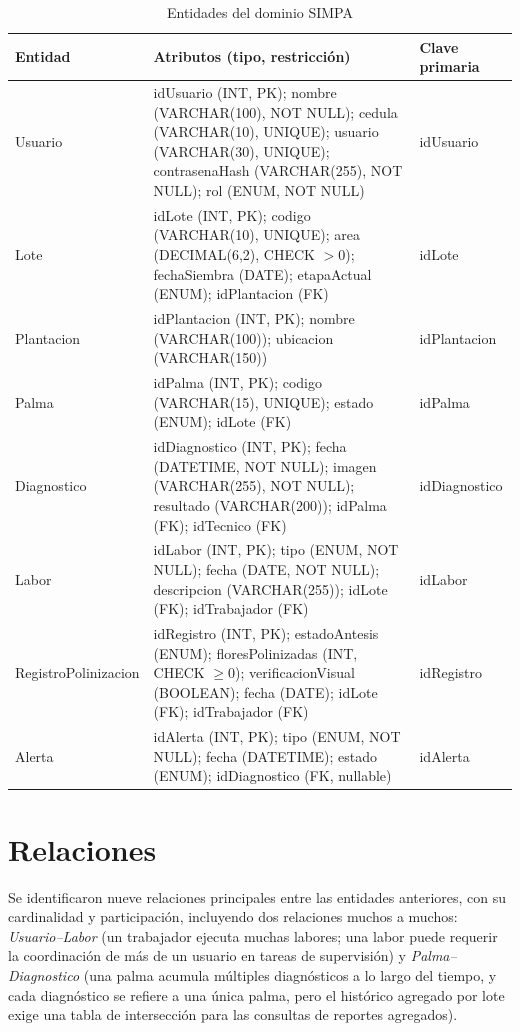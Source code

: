 \documentclass[11pt,a4paper]{report}
\begin{document}
\begin{table}[H]
\centering
\caption{Entidades del dominio SIMPA}
\label{tab:entidades}
\begin{tabularx}{\linewidth}{|l|Y|l|}
\hline
\textbf{Entidad} & \textbf{Atributos (tipo, restricción)} & \textbf{Clave primaria} \\
\hline
Usuario & idUsuario (INT, PK); nombre (VARCHAR(100), NOT NULL); cedula (VARCHAR(10), UNIQUE); usuario
(VARCHAR(30), UNIQUE); contrasenaHash (VARCHAR(255), NOT NULL); rol (ENUM, NOT NULL) & idUsuario \\
\hline
Lote & idLote (INT, PK); codigo (VARCHAR(10), UNIQUE); area (DECIMAL(6,2), CHECK $>0$); fechaSiembra
(DATE); etapaActual (ENUM); idPlantacion (FK) & idLote \\
\hline
Plantacion & idPlantacion (INT, PK); nombre (VARCHAR(100)); ubicacion (VARCHAR(150)) & idPlantacion \\
\hline
Palma & idPalma (INT, PK); codigo (VARCHAR(15), UNIQUE); estado (ENUM); idLote (FK) & idPalma \\
\hline
Diagnostico & idDiagnostico (INT, PK); fecha (DATETIME, NOT NULL); imagen (VARCHAR(255), NOT NULL);
resultado (VARCHAR(200)); idPalma (FK); idTecnico (FK) & idDiagnostico \\
\hline
Labor & idLabor (INT, PK); tipo (ENUM, NOT NULL); fecha (DATE, NOT NULL); descripcion (VARCHAR(255));
idLote (FK); idTrabajador (FK) & idLabor \\
\hline
RegistroPolinizacion & idRegistro (INT, PK); estadoAntesis (ENUM); floresPolinizadas (INT, CHECK
$\geq 0$); verificacionVisual (BOOLEAN); fecha (DATE); idLote (FK); idTrabajador (FK) & idRegistro \\
\hline
Alerta & idAlerta (INT, PK); tipo (ENUM, NOT NULL); fecha (DATETIME); estado (ENUM); idDiagnostico
(FK, nullable) & idAlerta \\
\hline
\end{tabularx}
\end{table}

\section{Relaciones}

Se identificaron nueve relaciones principales entre las entidades anteriores, con su cardinalidad y
participación, incluyendo dos relaciones muchos a muchos: \textit{Usuario--Labor} (un trabajador
ejecuta muchas labores; una labor puede requerir la coordinación de más de un usuario en tareas de
supervisión) y \textit{Palma--Diagnostico} (una palma acumula múltiples diagnósticos a lo largo del
tiempo, y cada diagnóstico se refiere a una única palma, pero el histórico agregado por lote exige una
tabla de intersección para las consultas de reportes agregados).
\end{document}
